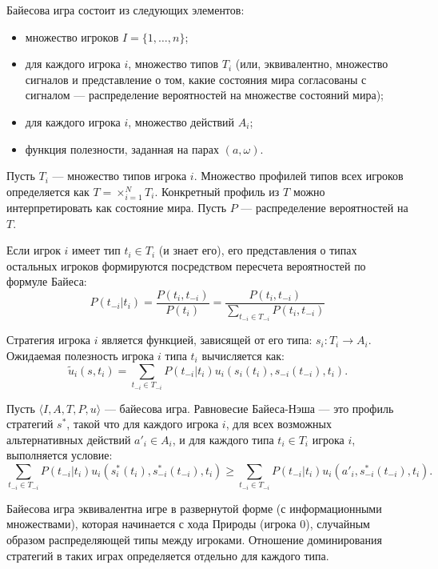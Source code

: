 \begin{definition}
Байесова игра состоит из следующих элементов:
\begin{itemize}
    \item множество игроков $I = \{1, \dots, n\}$;
    \item для каждого игрока $i$, множество типов $T_i$ (или, эквивалентно, множество сигналов и представление о том, какие состояния мира согласованы с сигналом — распределение вероятностей на множестве состояний мира);
    \item для каждого игрока $i$, множество действий $A_i$;
    \item функция полезности, заданная на парах $(a, \omega)$.
\end{itemize}
\end{definition}

Пусть $T_i$ — множество типов игрока $i$. Множество профилей типов всех игроков определяется как $T = \times_{i=1}^N T_i$. Конкретный профиль из $T$ можно интерпретировать как состояние мира. Пусть $P$ — распределение вероятностей на $T$. 

Если игрок $i$ имеет тип $t_i \in T_i$ (и знает его), его представления о типах остальных игроков формируются посредством пересчета вероятностей по формуле Байеса:
\[
P(t_{-i} | t_i) = \frac{P(t_i, t_{-i})}{P(t_i)} = \frac{P(t_i, t_{-i})}{\sum_{t_{-i} \in T_{-i}} P(t_i, t_{-i})}
\]

Стратегия игрока $i$ является функцией, зависящей от его типа: $s_i: T_i \to A_i$. Ожидаемая полезность игрока $i$ типа $t_i$ вычисляется как:
\[
\tilde{u}_i(s, t_i) = \sum_{t_{-i} \in T_{-i}} P(t_{-i} | t_i) u_i(s_i(t_i), s_{-i}(t_{-i}), t_i).
\]

\begin{definition}
Пусть $\langle I, A, T, P, u \rangle$ — байесова игра. Равновесие Байеса-Нэша — это профиль стратегий $s^*$, такой что для каждого игрока $i$, для всех возможных альтернативных действий $a'_i \in A_i$, и для каждого типа $t_i \in T_i$ игрока $i$, выполняется условие:
\[
\sum_{t_{-i} \in T_{-i}} P(t_{-i} | t_i) u_i(s_i^*(t_i), s_{-i}^*(t_{-i}), t_i) \ge \sum_{t_{-i} \in T_{-i}} P(t_{-i} | t_i) u_i(a'_i, s_{-i}^*(t_{-i}), t_i).
\]
\end{definition}

\begin{remark}
Байесова игра эквивалентна игре в развернутой форме (с информационными множествами), которая начинается с хода Природы (игрока 0), случайным образом распределяющей типы между игроками. Отношение доминирования стратегий в таких играх определяется отдельно для каждого типа.
\end{remark}

